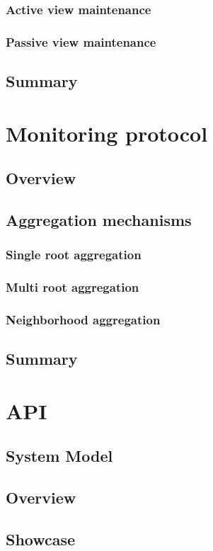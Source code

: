 \subsubsection{Active view maintenance}



\subsubsection{Passive view maintenance}


\subsection{Summary}

\section{Monitoring protocol}

\subsection{Overview}

\subsection{Aggregation mechanisms}

\subsubsection{Single root aggregation}

\subsubsection{Multi root aggregation}

\subsubsection{Neighborhood aggregation}

\subsection{Summary}

\section{API}

\subsection{System Model}

\subsection{Overview}

\subsection{Showcase}